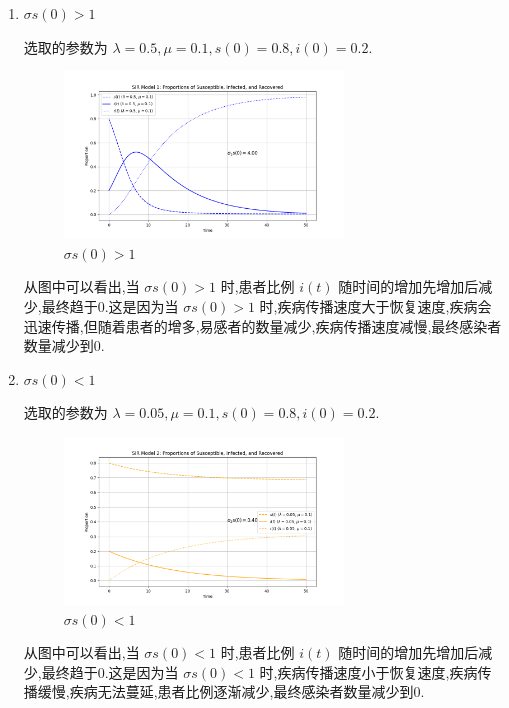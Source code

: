 \documentclass{article}
\begin{document}
\begin{enumerate}[label=(\arabic*)]
    \item $\sigma s(0) > 1$
    
    选取的参数为 $\lambda = 0.5, \mu = 0.1, s(0) = 0.8, i(0) = 0.2$.
    
    \begin{figure}[H]
    \centering
    \includegraphics[width=0.7\textwidth]{img/1.png}
    \caption{$\sigma s(0) > 1$}
    \end{figure}

    从图中可以看出,当 $\sigma s(0) > 1$ 时,患者比例 $i(t)$ 随时间的增加先增加后减少,最终趋于0.这是因为当 $\sigma s(0) > 1$ 时,疾病传播速度大于恢复速度,疾病会迅速传播,但随着患者的增多,易感者的数量减少,疾病传播速度减慢,最终感染者数量减少到0.

    \item $\sigma s(0) < 1$
    
    选取的参数为 $\lambda = 0.05, \mu = 0.1, s(0) = 0.8, i(0) = 0.2$.

    \begin{figure}[H]
    \centering
    \includegraphics[width=0.7\textwidth]{img/2.png}
    \caption{$\sigma s(0) < 1$}
    \end{figure}

    从图中可以看出,当 $\sigma s(0) < 1$ 时,患者比例 $i(t)$ 随时间的增加先增加后减少,最终趋于0.这是因为当 $\sigma s(0) < 1$ 时,疾病传播速度小于恢复速度,疾病传播缓慢,疾病无法蔓延,患者比例逐渐减少,最终感染者数量减少到0.

\end{enumerate}
\end{document}
